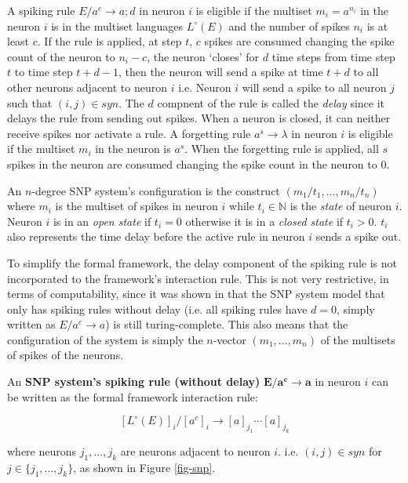 \documentclass[a4paper]{article}
\theoremstyle{definition}
\newcommand{\ra}{\rightarrow}
\begin{document}
A spiking rule $E/a^c \ra a;d$ in neuron $i$ is eligible if the multiset $m_i = a^{n_i}$ in the
neuron $i$ is in the multiset languages $L^{\circ}(E)$ and the number of spikes $n_i$ is at least
$c$. If the rule is applied, at step $t$, $c$ spikes are consumed changing the spike count of the
neuron to $n_i-c$, the neuron `closes' for $d$ time steps from time step $t$ to time step $t+d-1$, 
then the neuron will send a spike at time $t+d$ to all other neurons adjacent to neuron $i$ i.e.
Neuron $i$ will send a spike to all neuron $j$ such that $(i,j) \in syn$. The $d$ compnent of the
rule is called the \emph{delay} since it delays the rule from sending out spikes. When a neuron is 
closed, it can neither receive spikes nor activate a rule. A forgetting rule $a^s \ra \lambda$ in 
neuron $i$ is eligible if the multiset $m_i$ in the neuron is $a^s$. When the forgetting rule is 
applied, all $s$ spikes in the neuron are consumed changing the spike count in the neuron to $0$.

An $n$-degree SNP system's configuration is the construct $(m_1/t_1,...,m_n/t_n)$ where $m_i$ is
the multiset of spikes in neuron $i$ while $t_i \in \mathbb{N}$ is the \emph{state} of neuron $i$.
Neuron $i$ is in an \emph{open state} if $t_i = 0$ otherwise it is in a \emph{closed state} if
$t_i > 0$. $t_i$ also represents the time delay before the active rule in neuron $i$ sends a spike
out.

To simplify the formal framework, the delay component of the spiking rule is not incorporated to the
framework's interaction rule. This is not very restrictive, in terms of computability, since it was
shown in \cite{ibarra-2007-snp-normal} that the SNP system model that only has spiking rules without 
delay (i.e. all spiking rules have $d = 0$, simply written as $E/a^c \ra a$) is still 
turing-complete. This also means that the configuration of the system is simply the $n$-vector
$(m_1,...,m_n)$ of the multisets of spikes of the neurons. 

An \textbf{SNP system's spiking rule (without delay)} $\mathbf{E/a^c \ra a}$ in neuron $i$ can be 
written as the formal framework interaction rule: 

$${[L^{\circ}(E)]}_i/ {[a^c]}_i \ra {[a]}_{j_1} \cdots [a]_{j_k}$$

where neurons $j_1,...,j_k$ are neurons adjacent to neuron $i$. i.e. $(i,j) \in syn$ for $j \in \{
j_1,...,j_k\}$, as shown in Figure \ref{fig-snp}.
\end{document}
